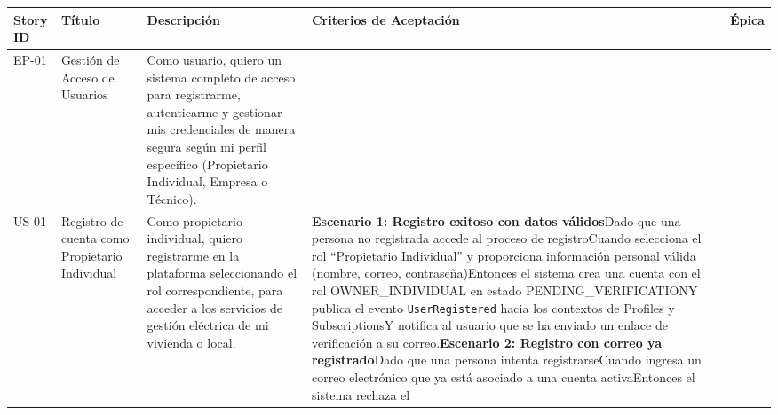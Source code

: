 {\def\LTcaptype{none} %
\begin{longtable}[]{@{}
  >{\raggedright\arraybackslash}p{}
  >{\raggedright\arraybackslash}p{}
  >{\raggedright\arraybackslash}p{}
  >{\raggedright\arraybackslash}p{}
  >{\raggedright\arraybackslash}p{}@{}}
\toprule\noalign{}
\begin{minipage}[b]{\linewidth}\raggedright
Story ID
\end{minipage} & \begin{minipage}[b]{\linewidth}\raggedright
Título
\end{minipage} & \begin{minipage}[b]{\linewidth}\raggedright
Descripción
\end{minipage} & \begin{minipage}[b]{\linewidth}\raggedright
Criterios de Aceptación
\end{minipage} & \begin{minipage}[b]{\linewidth}\raggedright
Épica
\end{minipage} \\
\midrule\noalign{}
\endhead
\bottomrule\noalign{}
\endlastfoot
EP-01 & Gestión de Acceso de Usuarios & Como usuario, quiero un sistema
completo de acceso para registrarme, autenticarme y gestionar mis
credenciales de manera segura según mi perfil específico (Propietario
Individual, Empresa o Técnico). & & \\
US-01 & Registro de cuenta como Propietario Individual & Como
propietario individual, quiero registrarme en la plataforma
seleccionando el rol correspondiente, para acceder a los servicios de
gestión eléctrica de mi vivienda o local. & \textbf{Escenario 1:
Registro exitoso con datos válidos}Dado que una persona no registrada
accede al proceso de registroCuando selecciona el rol ``Propietario
Individual'' y proporciona información personal válida (nombre, correo,
contraseña)Entonces el sistema crea una cuenta con el rol
OWNER\_INDIVIDUAL en estado PENDING\_VERIFICATIONY publica el evento
\texttt{UserRegistered} hacia los contextos de Profiles y SubscriptionsY
notifica al usuario que se ha enviado un enlace de verificación a su
correo.\textbf{Escenario 2: Registro con correo ya registrado}Dado que
una persona intenta registrarseCuando ingresa un correo electrónico que
ya está asociado a una cuenta activaEntonces el sistema rechaza el

\end{longtable}}

